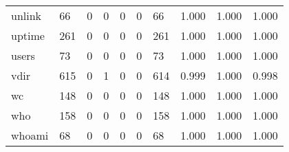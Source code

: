 \begin{longtable}{lp{1.3cm}p{1.3cm}p{1.3cm}p{1.3cm}p{1.3cm}p{1.3cm}p{1.3cm}p{1.3cm}p{1.3cm}}
unlink    &                     66 &                                             0 &                                            0 &                                           0 &                                            0 &                                         66 &                                1.000 &                                  1.000 &                                1.000 \\
uptime    &                    261 &                                             0 &                                            0 &                                           0 &                                            0 &                                        261 &                                1.000 &                                  1.000 &                                1.000 \\
users     &                     73 &                                             0 &                                            0 &                                           0 &                                            0 &                                         73 &                                1.000 &                                  1.000 &                                1.000 \\
vdir      &                    615 &                                             0 &                                            1 &                                           0 &                                            0 &                                        614 &                                0.999 &                                  1.000 &                                0.998 \\
wc        &                    148 &                                             0 &                                            0 &                                           0 &                                            0 &                                        148 &                                1.000 &                                  1.000 &                                1.000 \\
who       &                    158 &                                             0 &                                            0 &                                           0 &                                            0 &                                        158 &                                1.000 &                                  1.000 &                                1.000 \\
whoami    &                     68 &                                             0 &                                            0 &                                           0 &                                            0 &                                         68 &                                1.000 &                                  1.000 &                                1.000 \\

\end{longtable}
